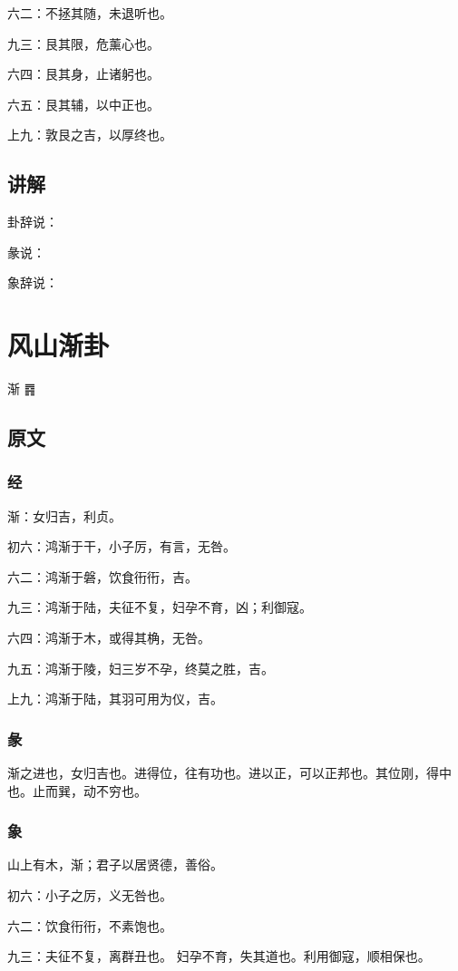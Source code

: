 \documentclass[12pt,oneside]{book}
\begin{document}
六二：不拯其随，未退听也。

九三：艮其限，危薰心也。

六四：艮其身，止诸躬也。

六五：艮其辅，以中正也。

上九：敦艮之吉，以厚终也。

\section{讲解}
卦辞说：

彖说：

象辞说：

\chapter{风山渐卦}
渐 {\Large ䷴}


\section{原文}

\subsection{经}
渐：女归吉，利贞。

初六：鸿渐于干，小子厉，有言，无咎。

六二：鸿渐于磐，饮食衎衎，吉。

九三：鸿渐于陆，夫征不复，妇孕不育，凶；利御寇。

六四：鸿渐于木，或得其桷，无咎。

九五：鸿渐于陵，妇三岁不孕，终莫之胜，吉。

上九：鸿渐于陆，其羽可用为仪，吉。

\subsection{彖}
渐之进也，女归吉也。进得位，往有功也。进以正，可以正邦也。其位刚，得中也。止而巽，动不穷也。

\subsection{象}
山上有木，渐；君子以居贤德，善俗。

初六：小子之厉，义无咎也。

六二：饮食衎衎，不素饱也。

九三：夫征不复，离群丑也。 妇孕不育，失其道也。利用御寇，顺相保也。
\end{document}
